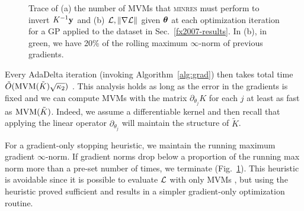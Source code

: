 \documentclass[twoside]{article}
\begin{document}
\begin{figure}[!ht]
\begin{center}
\end{center}
\caption{Trace of (a) the number of MVMs that \textsc{minres} must perform to invert $K^{-1}\textbf{y}$ and (b) $\mathcal{L}, \left\| \nabla\mathcal{L} \right\|$ given ${\boldsymbol\theta}$ at each optimization iteration for a GP applied to the dataset in Sec.~\ref{fx2007-results}. In (b), in green, we have 20\% of the rolling maximum $\infty$-norm of previous gradients.
}
\label{fx2007-iterations}
\end{figure}

Every AdaDelta iteration (invoking Algorithm~\ref{alg:grad}) then takes total time $\tilde{O}(\operatorname{MVM}(\tilde{K})\sqrt{\kappa_2})$ \citep{raykar2007fast}. This analysis holds as long as the error in the gradients is fixed and we can compute MVMs with the matrix $\partial_{\theta_j}K$ for each $j$ at least as fast as $\operatorname{MVM}({\tilde{K}})$. Indeed, we assume a differentiable kernel and then recall that applying the linear operator $\partial_{\theta_j}$ will maintain the structure of $\tilde{K}$.

For a gradient-only stopping heuristic, we maintain the running maximum gradient $\infty$-norm. If gradient norms drop below a proportion of the running max norm more than a pre-set number of times, we terminate (Fig.~\ref{fx2007-iterations}). This heuristic is avoidable since it is possible to evaluate $\mathcal{L}$ with only MVMs \citep{han2015large}, but using the heuristic proved sufficient and results in a simpler gradient-only optimization routine.
\end{document}

